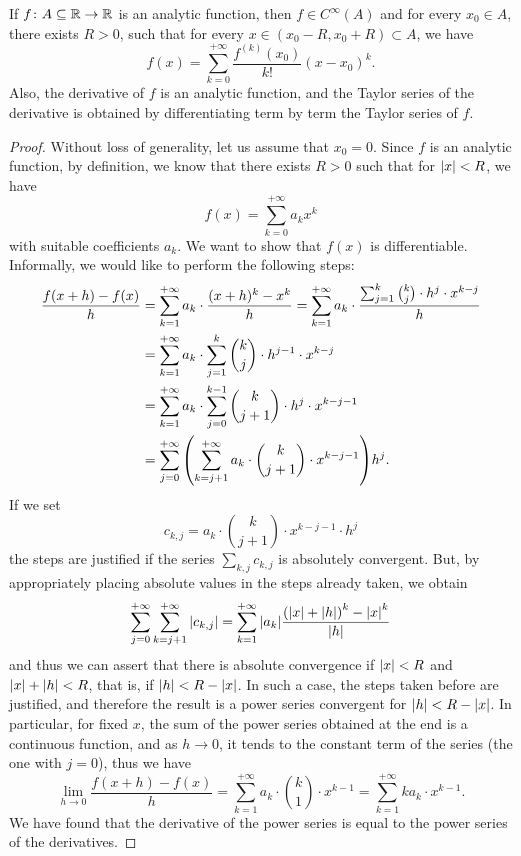 \begin{theorem}
\label{th:48765}%
If $f\colon A\subseteq {\mathbb R}\to{\mathbb R}$ is an analytic function, then $f\in C^\infty(A)$
and for every $x_0\in A$, there exists $R>0$, such that for every $x \in (x_0-R,
x_0+R)\subset A$, we have
\begin{equation}\label{eq:2344494}
  f(x) = \sum_{k=0}^{+\infty} \frac{f^{(k)}(x_0)}{k!}(x-x_0)^k.
\end{equation}
Also, the derivative of $f$ is an analytic function, and the Taylor series of
the derivative is obtained by differentiating term by term the Taylor series of
$f$.
\end{theorem}
%
\begin{proof}
Without loss of generality, let us assume that $x_0=0$. Since $f$ is an analytic
function, by definition, we know that there exists $R>0$ such that for
${\left|x\right|}<R$, we have
\[
f(x) = \sum_{k=0}^{+\infty} a_k x^k
\]
with suitable coefficients $a_k$. We want to show that $f(x)$ is differentiable.
Informally, we would like to perform the following steps:
\begin{align*}
\frac{f(x+h) - f(x)}{h}
&= \sum_{k=1}^{+\infty} a_k \cdot \frac{(x+h)^k-x^k}{h}
= \sum_{k=1}^{+\infty} a_k \cdot \frac{\sum_{j=1}^k {k\choose j} \cdot h^j \cdot
x^{k-j}}{h} \\
&= \sum_{k=1}^{+\infty} a_k \cdot \sum_{j=1}^k {k\choose j} \cdot h^{j-1} \cdot
x^{k-j} \\
&= \sum_{k=1}^{+\infty} a_k \cdot \sum_{j=0}^{k-1} {k\choose j+1} \cdot h^j
\cdot x^{k-j-1} \\
&= \sum_{j=0}^{+\infty} {\left( \sum_{k=j+1}^{+\infty} a_k \cdot {k\choose j+1}
\cdot x^{k-j-1} \right)} h^j.
\end{align*}
If we set
\[
  c_{k,j} = a_k\cdot {k\choose j+1}\cdot x^{k-j-1}\cdot h^j
\]
the steps are justified if the series $\sum_{k,j} c_{k,j}$ is absolutely
convergent. But, by appropriately placing absolute values in the steps already
taken, we obtain
\[
  \sum_{j=0}^{+\infty} \sum_{k=j+1}^{+\infty} {\left|c_{k,j}\right|}
    =  \sum_{k=1}^{+\infty} {\left|a_k\right|} \frac{{\left( {\left|x\right|} + {\left|h\right|} \right)}^k-{\left|x\right|}^k}{{\left|h\right|}}
\]
and thus we can assert that there is absolute convergence if ${\left|x\right|}<R$ and
${\left|x\right|}+{\left|h\right|}<R$, that is, if ${\left|h\right|}< R-{\left|x\right|}$. In such a case, the steps
taken before are justified, and therefore the result is a power series
convergent for ${\left|h\right|}<R-{\left|x\right|}$. In particular, for fixed $x$, the sum of the
power series obtained at the end is a continuous function, and as $h\to 0$, it
tends to the constant term of the series (the one with $j=0$), thus we have
\[
  \lim_{h\to 0} \frac{f(x+h)-f(x)}{h}
  = \sum_{k=1}^{+\infty} a_k \cdot {k \choose 1} \cdot x^{k-1}
  = \sum_{k=1}^{+\infty} k a_k \cdot x^{k-1}.
\]
We have found that the derivative of the power series is equal to the power
series of the derivatives.


\end{proof}
